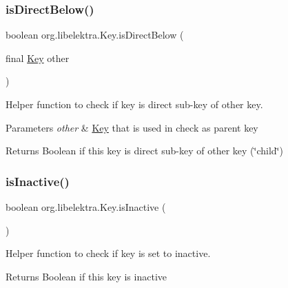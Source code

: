 \subsubsection{\texorpdfstring{isDirectBelow()}{isDirectBelow()}}
{\footnotesize\ttfamily boolean org.\+libelektra.\+Key.\+is\+Direct\+Below (\begin{DoxyParamCaption}\item[{final \mbox{\hyperlink{classorg_1_1libelektra_1_1Key}{Key}}}]{other }\end{DoxyParamCaption})\hspace{0.3cm}{\ttfamily [inline]}}



Helper function to check if key is direct sub-\/key of other key. 


\begin{DoxyParams}{Parameters}
{\em other} & \mbox{\hyperlink{classorg_1_1libelektra_1_1Key}{Key}} that is used in check as parent key \\
\hline
\end{DoxyParams}
\begin{DoxyReturn}{Returns}
Boolean if this key is direct sub-\/key of other key (\char`\"{}child\char`\"{}) 
\end{DoxyReturn}
\mbox{\label{classorg_1_1libelektra_1_1Key_a1707144b9d6c0c29531e3e372e1ffaee}} 
\subsubsection{\texorpdfstring{isInactive()}{isInactive()}}
{\footnotesize\ttfamily boolean org.\+libelektra.\+Key.\+is\+Inactive (\begin{DoxyParamCaption}{ }\end{DoxyParamCaption})\hspace{0.3cm}{\ttfamily [inline]}}



Helper function to check if key is set to inactive. 

\begin{DoxyReturn}{Returns}
Boolean if this key is inactive 
\end{DoxyReturn}
\mbox{\label{classorg_1_1libelektra_1_1Key_adfcebdd407d050b0626a8f2cfec00e8b}} 
